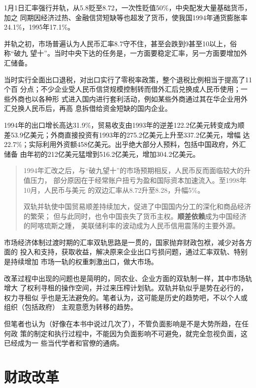 1月1日汇率强行并轨，从5.8贬至8.72，一次性贬值50\%，中央配发大量基础货币，加之
同期因经济过热、金融信贷短缺等也超发了货币，使我国1994年通货膨胀率24.1\%，1995年17.1\%。

并轨之初，市场普遍认为人民币汇率8.7守不住，甚至会跌到9甚至10以上，俗称“破九
望十”。当时中央下达的任务是，一方面要稳定汇率，另一方面要增加外汇储备。

当时实行全面出口退税，对出口实行了零税率政策，整个退税比例相当于提高了11个百
分点；不少企业受人民币信贷规模控制转而借外汇后兑换成人民币使用；一些外商也以各种形
式进入国内进行套利活动，例如某些外商通过其在华企业用外汇兑换人民币后，再高
息拆借给资金短缺的国内企业。

1994年的出口增长高达31.9\%，贸易收支由1993年的逆差122.2亿美元转变成为顺
差53.9亿美元；外商直接投资有1993年的275.2亿美元上升至337.2亿美元，增幅
达22.7\%；实际利用外资额458亿美元。出乎绝大部分人预料，包括中国政府，外汇储备
由年初的212亿美元猛增到516.2亿美元，增加304.2亿美元。

\begin{quotation}
  1994年汇改之后，与“破九望十”的市场预期相反，人民币反而面临较大的升值压力，
  部分原因在于经常账户扭亏为盈和国际资本加速流入。至1998年10月，人民币与美元
  的双边汇率从8.72升至8.28，升幅5\%。\cite{huilv70binggui}

  双轨并轨使中国贸易顺差持续加大，促进了中国国内分工的深化和商品经济的繁荣；
  但与此同时，也令中国丧失了货币主权。\textbf{顺差依赖}成为中国经济的阿喀琉斯之踵，
  美联储利率的波动成为人民币信用震荡的主要外源。\cite{dajueqi}
\end{quotation}

市场经济体制过渡时期的汇率双轨思路是一贯的，国家抛弃财政包袱，减少对各方面的
投入和支持，获取收益，解决原来企业出口亏损问题，通过汇率双轨、特别是持续增加
市场一轨的权重刺激出口，做大市场。


改革过程中出现的问题也是简明的，同农业、企业方面的双轨制一样，其中市场轨增大
了权利寻租的操作空间，并过来压榨计划轨。双轨并轨似乎是势在必行的，权力寻租似
乎也是无法避免的。笔者认为，这可能是历史的趋势吧，不以个人或组织（包括政府）
主观意愿为转移的趋势。

但笔者也认为（好像在本书中说过几次了），不管负面影响是不是大势所趋，在任何政
策的制定和执行过程中，不能因为负面影响不可避免，就完全忽视负面，这已经成为一
些当代学者和官僚的通病。

\section{财政改革}

